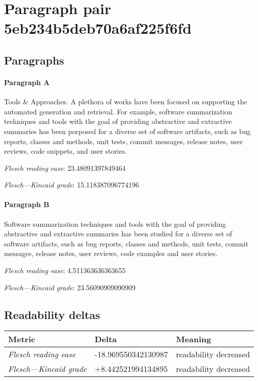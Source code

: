 \section{Paragraph pair 5eb234b5deb70a6af225f6fd}
\subsection{Paragraphs}
\paragraph{Paragraph A}
Tools \& Approaches. A plethora of works have been focused on supporting the automated generation and retrieval. For example, software summarization techniques and tools with the goal of providing abstractive and extractive summaries has been porposed for a diverse set of software artifacts, such as bug reports, classes and methods, unit tests, commit messages, release notes, user reviews, code snippets, and user stories.\par\medskip\emph{Flesch reading ease}: 23.48091397849464\par\emph{Flesch---Kincaid grade}: 15.118387096774196

\paragraph{Paragraph B}
Software summarization techniques and tools with the goal of providing abstractive and extractive summaries has been studied for a diverse set of software artifacts, such as bug reports, classes and methods, unit tests, commit messages, release notes, user reviews, code examples and user stories.\par\medskip\emph{Flesch reading ease}: 4.511363636363655\par\emph{Flesch---Kincaid grade}: 23.56090909090909

\subsection{Readability deltas}

\begin{tabular}{lll}
\toprule
               \textbf{Metric} &       \textbf{Delta} &       \textbf{Meaning} \\
\midrule
    \emph{Flesch reading ease} &  -18.969550342130987 &  readability decreased \\
 \emph{Flesch---Kincaid grade} &   +8.442521994134895 &  readability decreased \\
\bottomrule
\end{tabular}


